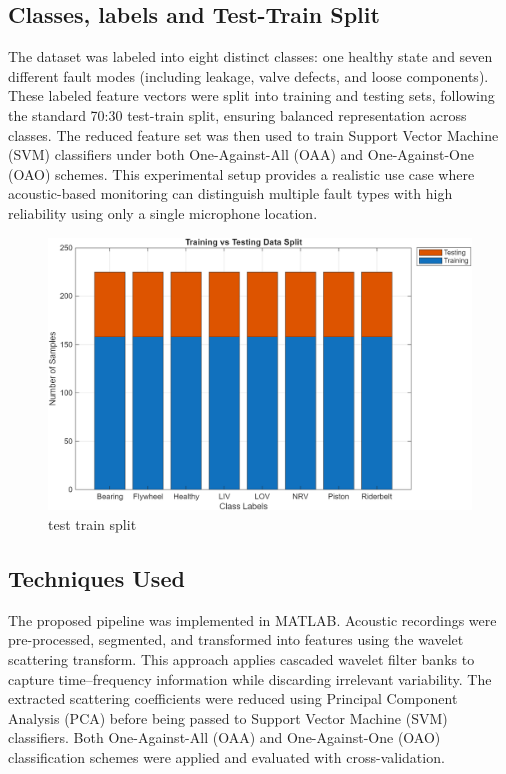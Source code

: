 \documentclass[12pt,a4paper]{article}
\begin{document}
\begin{multicols}{2}
\subsection{Classes, labels and Test-Train Split}
The dataset was labeled into eight distinct classes: one healthy state and seven different fault modes (including leakage, valve defects, and loose components). These labeled feature vectors were split into training and testing sets, following the standard 70:30 test-train split, ensuring balanced representation across classes. The reduced feature set was then used to train Support Vector Machine (SVM) classifiers under both One-Against-All (OAA) and One-Against-One (OAO) schemes. This experimental setup provides a realistic use case where acoustic-based monitoring can distinguish multiple fault types with high reliability using only a single microphone location.
\begin{figure}[H]
    \centering
    \includegraphics[width=1\linewidth]{Diagrams/split.png}
    \caption{test train split}
    \label{fig:split}
\end{figure}
\subsection{Techniques Used}

The proposed pipeline was implemented in MATLAB. Acoustic recordings were pre-processed, segmented, and transformed into features using the wavelet scattering transform. This approach applies cascaded wavelet filter banks to capture time--frequency information while discarding irrelevant variability. The extracted scattering coefficients were reduced using Principal Component Analysis (PCA) before being passed to Support Vector Machine (SVM) classifiers. Both One-Against-All (OAA) and One-Against-One (OAO) classification schemes were applied and evaluated with cross-validation.


\end{multicols}
\end{document}
